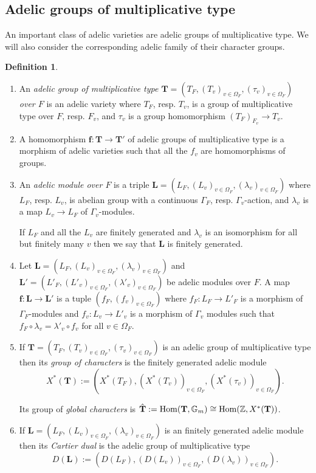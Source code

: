 \documentclass[a4paper,11pt,reqno]{amsart}
\newcommand{\G}{\mathbb{G}}
\DeclareMathOperator{\Hom}{Hom}
\theoremstyle{definition}
\newtheorem{definition}[theorem]{Definition}
\begin{document}
\subsection{Adelic groups of multiplicative type}
An important class of adelic varieties are adelic groups of multiplicative type. We will also consider the corresponding adelic family of their character groups.
\begin{definition} \hfill
	\begin{enumerate}
		\item An \emph{adelic group of multiplicative type $\mathbf{T} = (T_F, (T_v)_{v \in \Omega_F}, (\tau_v)_{v \in \Omega_F})$ over $F$} is an adelic variety where $T_F$, resp. $T_v$, is a group of multiplicative type over $F$, resp. $F_v$, and $\tau_v$ is a group homomorphism $(T_F)_{F_v} \to T_v$.
		\item A homomorphism $\mathbf{f}: \mathbf{T} \to \mathbf{T'}$ of adelic groups of multiplicative type is a morphism of adelic varieties such that all the $f_v$ are homomorphisms of groups.
		\item An \emph{adelic module over $F$} is a triple $\mathbf{L} = (L_F, (L_v)_{v \in \Omega_F}, (\lambda_v)_{v \in \Omega_F})$ where $L_F$, resp. $L_v$, is abelian group with a continuous $\Gamma_F$, resp. $\Gamma_v$-action, and $\lambda_v$ is a map $L_v \to L_F$ of $\Gamma_v$-modules.
		
		If $L_F$ and all the $L_v$ are finitely generated and $\lambda_v$ is an isomorphism for all but finitely many $v$ then we say that $\mathbf{L}$ is finitely generated.
		
		\item Let $\mathbf{L} = (L_F, (L_v)_{v \in \Omega_F}, (\lambda_v)_{v \in \Omega_F})$ and $\mathbf{L}' = (L'_F, (L'_v)_{v \in \Omega_F}, (\lambda'_v)_{v \in \Omega_F})$ be adelic modules over $F$. A map $\bm{f}: \mathbf{L} \to \mathbf{L}'$ is a tuple $(f_F, (f_v)_{v \in \Omega_F})$ where $f_F: L_F \to L'_F$ is a morphism of $\Gamma_F$-modules and $f_v: L_v \to L'_v$ is a morphism of $\Gamma_v$ modules such that $f_F \circ \lambda_v = \lambda'_v \circ f_v$ for all $v \in \Omega_F$.
		\item If $\mathbf{T} = (T_F, (T_v)_{v \in \Omega_F}, (\tau_v)_{v \in \Omega_F})$ is an adelic group of multiplicative type then its \emph{group of characters} is the finitely generated adelic module
		\begin{equation*}
			X^*(\mathbf{T}) := (X^*(T_F), (X^*(T_v))_{v \in \Omega_F}, (X^*(\tau_v))_{v \in \Omega_F}).
		\end{equation*}
		
		Its group of \emph{global characters} is $\hat{\mathbf{T}} := \Hom(\mathbf{T}, \G_m) \cong \Hom(\Z, X^*(\mathbf{T}))$.
		\item If $\mathbf{L} = (L_F, (L_v)_{v \in \Omega_F}, (\lambda_v)_{v \in \Omega_F})$ is an finitely generated adelic module then its \emph{Cartier dual} is the adelic group of multiplicative type 
		\begin{equation*}
			D(\mathbf{L}) := (D(L_F), (D(L_v))_{v \in \Omega_F}, (D(\lambda_v))_{v \in \Omega_F}).
		\end{equation*}
	\end{enumerate}
\end{definition}
\end{document}
